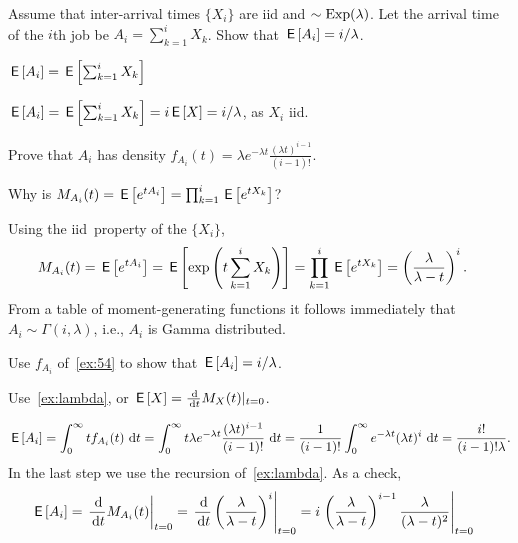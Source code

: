 \begin{exercise}\label{ex:30}
 Assume  that inter-arrival times $\{X_i\}$ are iid and $\sim\operatorname{Exp}(\lambda)$. Let
the arrival time of the $i$th job be $A_i=\sum_{k=1}^i X_k$. Show that
$\,\mathsf{E}\left[A_i\right] = i/\lambda$.
\begin{hint}
$\,\mathsf{E}\left[A_i\right] = \,\mathsf{E}\left[\sum_{k=1}^i X_k\right]$
\end{hint}
\begin{solution}
$\,\mathsf{E}\left[A_i\right] = \,\mathsf{E}\left[\sum_{k=1}^i X_k\right] = i \,\mathsf{E}\left[X\right] =  i/ \lambda$, as $X_i$ iid.
\end{solution}
\end{exercise}

\begin{exercise}\label{ex:54}
 Prove that $A_i$ has density 
$f_{A_i}(t) = \lambda e^{-\lambda t} \frac{(\lambda t)^{i-1}}{(i-1)!}$.
\begin{hint}
Why is $M_{A_i}(t) = \,\mathsf{E}\left[e^{t A_i}\right] = \prod_{k=1}^{i} \,\mathsf{E}\left[e^{tX_k}\right]$?
\end{hint}
\begin{solution}
 Using the iid\ property of the $\{X_i\}$,
\begin{align*}
 M_{A_i}(t) &= \,\mathsf{E}\left[e^{t A_i}\right] = \,\mathsf{E}\left[\exp\left(t\sum_{k=1}^{i} X_k\right)\right]  = \prod_{k=1}^{i} \,\mathsf{E}\left[e^{tX_k}\right] =
  \left(\frac{\lambda}{\lambda -t }\right)^i.
\end{align*}
From a table of moment-generating functions it follows immediately that
$A_i \sim \Gamma(i,\lambda)$, i.e., $A_i$ is Gamma distributed.
\end{solution}
\end{exercise}

\begin{exercise}
 Use   $f_{A_i}$ of~\cref{ex:54} to show that $\,\mathsf{E}\left[A_i\right]=i/\lambda$.
\begin{hint}
Use~\cref{ex:lambda}, or $\E X = \frac{\d}{\d t} M_X(t) |_{t=0}$.
\end{hint}
\begin{solution}
 \begin{equation*}
\,\mathsf{E}\left[A_i\right] = \int_0^\infty t f_{A_i} (t) \, \,\textrm{d}t =
\int_0^\infty t \lambda e^{-\lambda t} \frac{(\lambda t)^{i-1}}{(i-1)!}\, \,\textrm{d}t = \frac{1}{(i-1)!} \int_0^\infty e^{-\lambda t} (\lambda t)^i\,\,\textrm{d}t = \frac{i!}{(i-1)!\lambda}.
\end{equation*}
In the last step we use the recursion of~\cref{ex:lambda}.
As a check,
\begin{align*}
 \E{A_i}
&= \left.\frac{\d}{\d t} M_{A_i}(t)\right|_{t=0}
= \left.\frac{\d}{\d t} \left(\frac{\lambda}{\lambda-t}\right)^i\right|_{t=0}
= i \left.\left(\frac{\lambda}{\lambda-t}\right)^{i-1}\frac{\lambda}{(\lambda-t)^2}\right|_{t=0}
\end{align*}


\end{solution}
\end{exercise}

